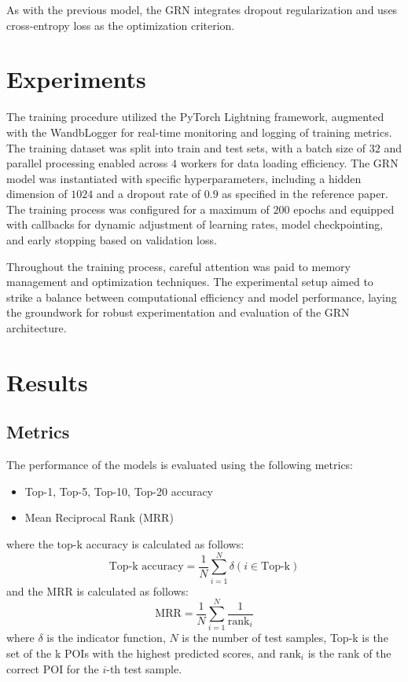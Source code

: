 \documentclass[twocolumn,twoside]{article}
\begin{document}
As with the previous model, the GRN integrates dropout regularization and uses
cross-entropy loss as the optimization criterion.
\section{Experiments}
The training procedure utilized the PyTorch Lightning framework,
augmented with the WandbLogger for real-time monitoring and logging of
training metrics. The training dataset was split into train and test sets,
with a batch size of $32$ and parallel processing enabled across $4$ workers for
data loading efficiency. The GRN model was instantiated with specific
hyperparameters, including a hidden dimension of $1024$ and a dropout rate of $0.9$
as specified in the reference paper. The training process was configured
for a maximum of $200$ epochs and equipped with callbacks for dynamic
adjustment of learning rates, model checkpointing, and early
stopping based on validation loss.

Throughout the training process, careful attention was paid to memory
management and optimization techniques. The experimental setup aimed to
strike a balance between computational efficiency and model performance,
laying the groundwork for robust experimentation and evaluation of the
GRN architecture.
\section{Results}
\subsection{Metrics}
The performance of the models is evaluated using the following metrics:
\begin{itemize}
  \item Top-1, Top-5, Top-10, Top-20 accuracy
  \item Mean Reciprocal Rank (MRR)
\end{itemize}
where the top-k accuracy is calculated as follows:
\begin{equation}
  \text{Top-k accuracy} = \frac{1}{N} \sum_{i=1}^{N} \delta(i \in \text{Top-k})
\end{equation}
and the MRR is calculated as follows:
\begin{equation}
  \text{MRR} = \frac{1}{N} \sum_{i=1}^{N} \frac{1}{\text{rank}_i}
\end{equation}
where $\delta$ is the indicator function, $N$ is the number of test samples, Top-k is the set of the k
POIs with the highest predicted scores,
and $\text{rank}_i$ is the rank of the correct POI for the $i$-th test sample.
\end{document}
